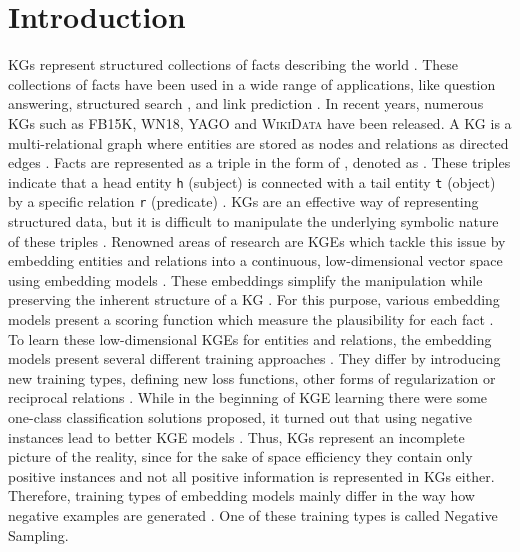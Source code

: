 \chapter{Introduction}
\label{ch:introduction}

\acp{KG} represent structured collections of facts describing the world  \cite{hogan2020knowledge}.
These collections of facts have been used in a wide range of applications, like question answering, structured search \cite{zhang2019nscaching}, and link prediction \cite{cai2017kbgan, Alam2020AffinityDN}.
In recent years, numerous \acp{KG} such as \textsc{FB15K}, \textsc{WN18}, \textsc{YAGO} \cite{ConEx} and \textsc{WikiData} \cite{arnaoutwikinegata} have been released.
A \ac{KG} is a multi-relational graph where entities are stored as nodes and relations as directed edges \cite{zhang2019nscaching}.
Facts are represented as a triple in the form of , denoted as  .
These triples indicate that a head entity \texttt{h} (subject) is connected with a tail entity \texttt{t} (object) by a specific relation \texttt{r} (predicate) \cite{zhang2019nscaching, Alam2020AffinityDN}.
\acp{KG} are an effective way of representing structured data, but it is difficult to manipulate the underlying symbolic nature of these triples \cite{8047276}.
Renowned areas of research are \acp{KGE} which tackle this issue by embedding entities and relations into a continuous, low-dimensional vector space using embedding models \cite{Alam2020AffinityDN}.
These embeddings simplify the manipulation while preserving the inherent structure of a \ac{KG} \cite{8047276}. 
For this purpose, various embedding models present a scoring function which measure the plausibility for each fact \cite{8047276, ConvE, qiannegative}.
To learn these low-dimensional \acp{KGE} for entities and relations, the embedding models present several different training approaches \cite{Ruffinelli2020You}.
They differ by introducing new training types, defining new loss functions, other forms of regularization or reciprocal relations \cite{Ruffinelli2020You}.
While in the beginning of \ac{KGE} learning there were some one-class classification solutions proposed, it turned out that using negative instances lead to better \ac{KGE} models \cite{kotnis2017analysis}.
Thus, \acp{KG} represent an incomplete picture of the reality, since for the sake of space efficiency they contain only positive instances \cite{qiannegative} and not all positive information is represented in \acp{KG} either.
Therefore, training types of embedding models mainly differ in the way 
how negative examples are generated \cite{Ruffinelli2020You}. 
One of these training types is called Negative Sampling.

